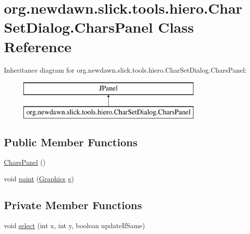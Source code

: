 \hypertarget{classorg_1_1newdawn_1_1slick_1_1tools_1_1hiero_1_1_char_set_dialog_1_1_chars_panel}{}\section{org.\+newdawn.\+slick.\+tools.\+hiero.\+Char\+Set\+Dialog.\+Chars\+Panel Class Reference}
\label{classorg_1_1newdawn_1_1slick_1_1tools_1_1hiero_1_1_char_set_dialog_1_1_chars_panel}
Inheritance diagram for org.\+newdawn.\+slick.\+tools.\+hiero.\+Char\+Set\+Dialog.\+Chars\+Panel\+:\begin{figure}[H]
\begin{center}
\leavevmode
\includegraphics[height=2.000000cm]{classorg_1_1newdawn_1_1slick_1_1tools_1_1hiero_1_1_char_set_dialog_1_1_chars_panel}
\end{center}
\end{figure}
\subsection*{Public Member Functions}
\begin{DoxyCompactItemize}
\item 
\mbox{\hyperlink{classorg_1_1newdawn_1_1slick_1_1tools_1_1hiero_1_1_char_set_dialog_1_1_chars_panel_af2595520765209ef657358867ab6e971}{Chars\+Panel}} ()
\item 
void \mbox{\hyperlink{classorg_1_1newdawn_1_1slick_1_1tools_1_1hiero_1_1_char_set_dialog_1_1_chars_panel_ad34d8f7b91e83632eaf8b93461a9e873}{paint}} (\mbox{\hyperlink{classorg_1_1newdawn_1_1slick_1_1_graphics}{Graphics}} g)
\end{DoxyCompactItemize}
\subsection*{Private Member Functions}
\begin{DoxyCompactItemize}
\item 
void \mbox{\hyperlink{classorg_1_1newdawn_1_1slick_1_1tools_1_1hiero_1_1_char_set_dialog_1_1_chars_panel_a57f075b0851428a9a7ac6ff46c8013f9}{select}} (int x, int y, boolean update\+If\+Same)
\end{DoxyCompactItemize}
